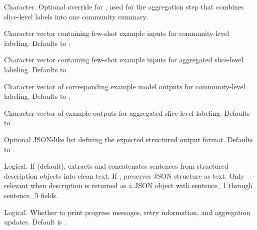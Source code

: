 \documentclass[a4paper]{book}
\begin{document}
\begin{Arguments}
\begin{ldescription}
\item[\code{system\_slices}] Character. Optional override for ,
used for the aggregation step that combines slice-level labels into one community summary.

\item[\code{example}] Character vector containing few-shot example inputs for community-level labeling.
Defaults to .

\item[\code{example\_slices}] Character vector containing few-shot example inputs for aggregated
slice-level labeling. Defaults to .

\item[\code{answer}] Character vector of corresponding example model outputs for community-level labeling.
Defaults to .

\item[\code{answer\_slices}] Character vector of example outputs for aggregated slice-level labeling.
Defaults to .

\item[\code{schema}] Optional JSON-like list defining the expected structured output format.
Defaults to .

\item[\code{keep\_description\_json}] Logical. If  (default), extracts and concatenates
sentences from structured description objects into clean text. If , preserves JSON
structure as text. Only relevant when description is returned as a JSON object with
sentence\_1 through sentence\_5 fields.

\item[\code{verbose}] Logical. Whether to print progress messages, retry information,
and aggregation updates. Default is .
\end{ldescription}
\end{Arguments}
%
\end{document}
